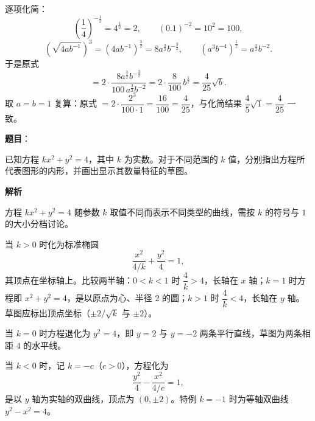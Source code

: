 \begin{answer}
逐项化简：
\nopagebreak[4]
\[
\left(\frac14\right)^{-\frac12}=4^{\frac12}=2,\qquad (0.1)^{-2}=10^2=100,
\]
\nopagebreak[4]
\[
\left(\sqrt{4ab^{-1}}\right)^3=\left(4ab^{-1}\right)^{\frac32}=8a^{\frac32}b^{-\frac32},\qquad
\left(a^3b^{-4}\right)^{\frac12}=a^{\frac32}b^{-2}.
\]
于是原式
\nopagebreak[4]
\[
=2\cdot\frac{8a^{\frac32}b^{-\frac32}}{100\,a^{\frac32}b^{-2}}
=2\cdot\frac{8}{100}\,b^{\frac12}=\frac{4}{25}\sqrt b.
\]
取 $a=b=1$ 复算：原式 $=2\cdot\dfrac{2^3}{100\cdot1}=\dfrac{16}{100}=\dfrac{4}{25}$，与化简结果 $\dfrac45\sqrt1=\dfrac{4}{25}$ 一致。



\gkanswer{答案（3）：$x\ge-1$（即 $[-1,+\infty)$）}



\end{answer}
\begin{answer}

\textbf{题目}：

已知方程 $kx^2+y^2=4$，其中 $k$ 为实数。对于不同范围的 $k$ 值，分别指出方程所代表图形的内形，并画出显示其数量特征的草图。

\textbf{解析}

方程 $kx^2+y^2=4$ 随参数 $k$ 取值不同而表示不同类型的曲线，需按 $k$ 的符号与 $1$ 的大小分档讨论。

当 $k>0$ 时化为标准椭圆
\nopagebreak[4]
\[
\frac{x^2}{4/k}+\frac{y^2}{4}=1,
\]
其顶点在坐标轴上。比较两半轴：$0<k<1$ 时 $\dfrac4k>4$，长轴在 $x$ 轴；$k=1$ 时方程即 $x^2+y^2=4$，是以原点为心、半径 $2$ 的圆；$k>1$ 时 $\dfrac4k<4$，长轴在 $y$ 轴。草图应标出顶点坐标（$\pm2/\sqrt k$ 与 $\pm2$）。

当 $k=0$ 时方程退化为 $y^2=4$，即 $y=2$ 与 $y=-2$ 两条平行直线，草图为两条相距 $4$ 的水平线。

当 $k<0$ 时，记 $k=-c$（$c>0$），方程化为
\nopagebreak[4]
\[
\frac{y^2}{4}-\frac{x^2}{4/c}=1,
\]
是以 $y$ 轴为实轴的双曲线，顶点为 $(0,\pm2)$。特例 $k=-1$ 时为等轴双曲线 $y^2-x^2=4$。


\end{answer}
